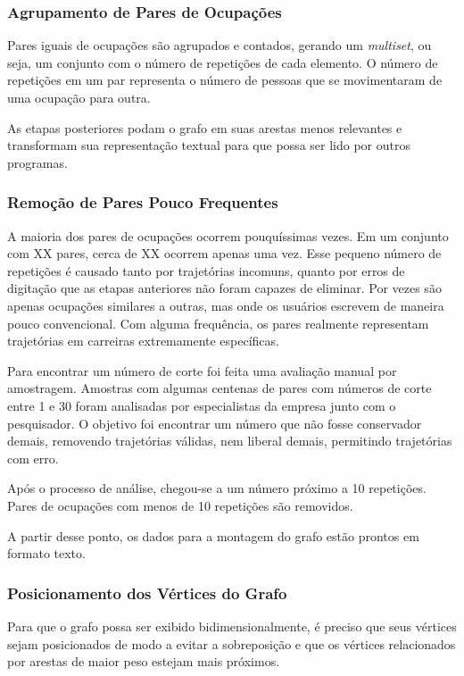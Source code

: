 \documentclass[12pt,a4paper]{article}
\theoremstyle{hypo}
\begin{document}
\subsubsection{Agrupamento de Pares de Ocupações}

Pares iguais de ocupações são agrupados e contados, gerando um \textit{multiset}, ou seja, um conjunto com o número de repetições de cada elemento. O número de repetições em um par representa o número de pessoas que se movimentaram de uma ocupação para outra.

As etapas posteriores podam o grafo em suas arestas menos relevantes e transformam sua representação textual para que possa ser lido por outros programas.

\subsubsection{Remoção de Pares Pouco Frequentes} \label{sec:grafo-final}

A maioria dos pares de ocupações ocorrem pouquíssimas vezes. Em um conjunto com XX pares, cerca de XX ocorrem apenas uma vez. Esse pequeno número de repetições é causado tanto por trajetórias incomuns, quanto por erros de digitação que as etapas anteriores não foram capazes de eliminar. Por vezes são apenas ocupações similares a outras, mas onde os usuários escrevem de maneira pouco convencional. Com alguma frequência, os pares realmente representam trajetórias em carreiras extremamente específicas.

Para encontrar um número de corte foi feita uma avaliação manual por amostragem. Amostras com algumas centenas de pares com números de corte entre 1 e 30 foram analisadas por especialistas da empresa junto com o pesquisador. O objetivo foi encontrar um número que não fosse conservador demais, removendo trajetórias válidas, nem liberal demais, permitindo trajetórias com erro.

Após o processo de análise, chegou-se a um número próximo a 10 repetições. Pares de ocupações com menos de 10 repetições são removidos.

A partir desse ponto, os dados para a montagem do grafo estão prontos em formato texto.

\subsubsection{Posicionamento dos Vértices do Grafo}

Para que o grafo possa ser exibido bidimensionalmente, é preciso que seus vértices sejam posicionados de modo a evitar a sobreposição e que os vértices relacionados por arestas de maior peso estejam mais próximos.
\end{document}
